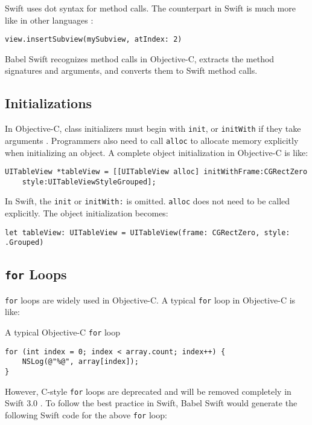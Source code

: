 \documentclass{sfuthesis}
\begin{document}
Swift uses dot syntax for method calls. The counterpart in Swift is much more like in other languages \cite{swiftobjcapis}:

\begin{verbatim}
view.insertSubview(mySubview, atIndex: 2)
\end{verbatim}

Babel Swift recognizes method calls in Objective-C, extracts the method signatures and arguments, and converts them to Swift method calls.

\subsection{Initializations}

In Objective-C, class initializers must begin with \texttt{init}, or \texttt{initWith} if they take arguments \cite{objcinit}. Programmers also need to call \texttt{alloc} to allocate memory explicitly when initializing an object. A complete object initialization in Objective-C is like:

\begin{verbatim}
UITableView *tableView = [[UITableView alloc] initWithFrame:CGRectZero
    style:UITableViewStyleGrouped];
\end{verbatim}

In Swift, the \texttt{init} or \texttt{initWith:} is omitted. \texttt{alloc} does not need to be called explicitly. The object initialization becomes:

\begin{verbatim}
let tableView: UITableView = UITableView(frame: CGRectZero, style: .Grouped)
\end{verbatim}

\subsection{\texttt{for} Loops}

\texttt{for} loops are widely used in Objective-C. A typical \texttt{for} loop in Objective-C is like:

\begin{listing}[H]
\caption{A typical Objective-C \texttt{for} loop}
\label{lst:forloop}
\begin{verbatim}
for (int index = 0; index < array.count; index++) {
    NSLog(@"%@", array[index]);
}
\end{verbatim}
\end{listing}

However, C-style \texttt{for} loops are deprecated and will be removed completely in Swift 3.0 \cite{removecforloops}. To follow the best practice in Swift, Babel Swift would generate the following Swift code for the above \texttt{for} loop:
\end{document}

